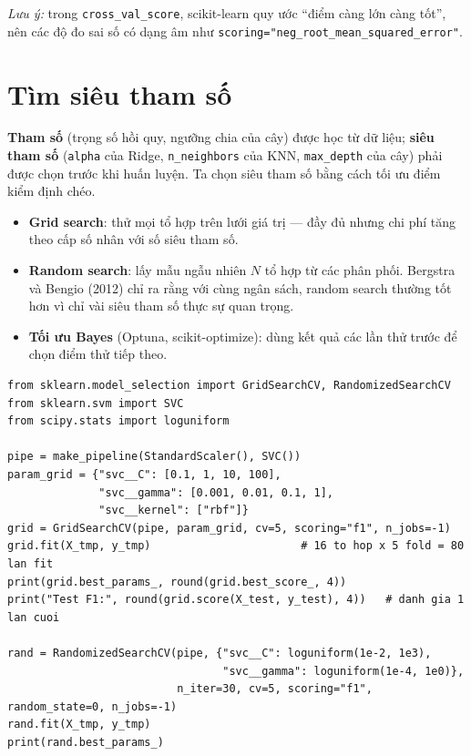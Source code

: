 \noindent\textit{Lưu ý:} trong \texttt{cross\_val\_score}, scikit-learn quy ước ``điểm càng lớn càng tốt'', nên các độ đo sai số có dạng âm như \texttt{scoring="neg\_root\_mean\_squared\_error"}.

\section{Tìm siêu tham số}

\textbf{Tham số} (trọng số hồi quy, ngưỡng chia của cây) được học từ dữ liệu; \textbf{siêu tham số} (\texttt{alpha} của Ridge, \texttt{n\_neighbors} của KNN, \texttt{max\_depth} của cây) phải được chọn trước khi huấn luyện. Ta chọn siêu tham số bằng cách tối ưu điểm kiểm định chéo.

\begin{itemize}
    \item \textbf{Grid search}: thử mọi tổ hợp trên lưới giá trị --- đầy đủ nhưng chi phí tăng theo cấp số nhân với số siêu tham số.
    \item \textbf{Random search}: lấy mẫu ngẫu nhiên $N$ tổ hợp từ các phân phối. Bergstra và Bengio (2012) chỉ ra rằng với cùng ngân sách, random search thường tốt hơn vì chỉ vài siêu tham số thực sự quan trọng.
    \item \textbf{Tối ưu Bayes} (Optuna, scikit-optimize): dùng kết quả các lần thử trước để chọn điểm thử tiếp theo.
\end{itemize}

\begin{lstlisting}[caption={GridSearchCV và RandomizedSearchCV}]
from sklearn.model_selection import GridSearchCV, RandomizedSearchCV
from sklearn.svm import SVC
from scipy.stats import loguniform

pipe = make_pipeline(StandardScaler(), SVC())
param_grid = {"svc__C": [0.1, 1, 10, 100],
              "svc__gamma": [0.001, 0.01, 0.1, 1],
              "svc__kernel": ["rbf"]}
grid = GridSearchCV(pipe, param_grid, cv=5, scoring="f1", n_jobs=-1)
grid.fit(X_tmp, y_tmp)                       # 16 to hop x 5 fold = 80 lan fit
print(grid.best_params_, round(grid.best_score_, 4))
print("Test F1:", round(grid.score(X_test, y_test), 4))   # danh gia 1 lan cuoi

rand = RandomizedSearchCV(pipe, {"svc__C": loguniform(1e-2, 1e3),
                                 "svc__gamma": loguniform(1e-4, 1e0)},
                          n_iter=30, cv=5, scoring="f1", random_state=0, n_jobs=-1)
rand.fit(X_tmp, y_tmp)
print(rand.best_params_)
\end{lstlisting}

